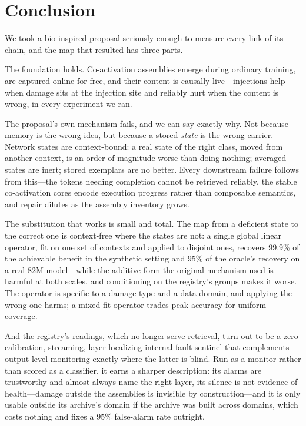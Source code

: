 \documentclass[11pt]{article}
\begin{document}
\section{Conclusion}

We took a bio-inspired proposal seriously enough to measure every link of its
chain, and the map that resulted has three parts.

The foundation holds. Co-activation assemblies emerge during ordinary training,
are captured online for free, and their content is causally live---injections
help when damage sits at the injection site and reliably hurt when the content
is wrong, in every experiment we ran.

The proposal's own mechanism fails, and we can say exactly why. Not because
memory is the wrong idea, but because a stored \emph{state} is the wrong
carrier. Network states are context-bound: a real state of the right class,
moved from another context, is an order of magnitude worse than doing nothing;
averaged states are inert; stored exemplars are no better. Every downstream
failure follows from this---the tokens needing completion cannot be retrieved
reliably, the stable co-activation cores encode execution progress rather than
composable semantics, and repair dilutes as the assembly inventory grows.

The substitution that works is small and total. The map from a deficient state
to the correct one is context-free where the states are not: a single global
linear operator, fit on one set of contexts and applied to disjoint ones,
recovers 99.9\% of the achievable benefit in the synthetic setting and 95\% of
the oracle's recovery on a real 82M model---while the additive form the original
mechanism used is harmful at both scales, and conditioning on the registry's
groups makes it worse. The operator is specific to a damage type and a data
domain, and applying the wrong one harms; a mixed-fit operator trades peak
accuracy for uniform coverage.

And the registry's readings, which no longer serve retrieval, turn out to be a
zero-calibration, streaming, layer-localizing internal-fault sentinel that
complements output-level monitoring exactly where the latter is blind. Run as a
monitor rather than scored as a classifier, it earns a sharper description:
its alarms are trustworthy and almost always name the right layer, its silence
is not evidence of health---damage outside the assemblies is invisible by
construction---and it is only usable outside its archive's domain if the
archive was built across domains, which costs nothing and fixes a 95\% false-alarm
rate outright.
\end{document}
